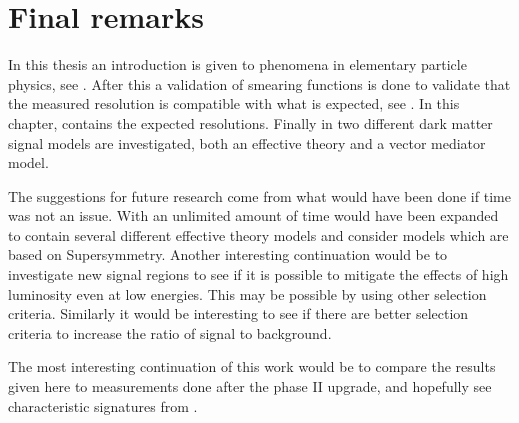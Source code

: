 \chapter{Final remarks}\label{cha:res}
In this thesis an introduction is given to phenomena in elementary particle 
\\physics, see . After this a validation of smearing functions is done to validate that the measured resolution is compatible with what is expected, see . In this chapter,  contains the expected resolutions. Finally in  two different dark matter signal models are investigated, both an effective theory and a vector mediator model.

The suggestions for future research come from what would have been done if time was not an issue. With an unlimited amount of time  would have been expanded to contain several different effective theory models and consider models which are based on Supersymmetry. Another interesting continuation would be to investigate new signal regions to see if it is possible to mitigate the effects of high luminosity even at low energies. This may be possible by using other selection criteria. Similarly it would be interesting to see if there are better selection criteria to increase the ratio of signal to background.  

The most interesting continuation of this work would be to compare the results given here to measurements done after the phase II upgrade, and hopefully see characteristic signatures from \abbrWIMPS .